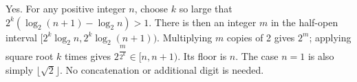 Yes. For any positive integer $n$, choose $k$ so large that $2^k(\log_2(n+1)-\log_2 n)>1$. There is then an integer $m$ in the half-open interval $[2^k\log_2 n,2^k\log_2(n+1))$. Multiplying $m$ copies of 2 gives $2^m$; applying square root $k$ times gives $2^{\dfrac{m}{2^k}}\in[n,n+1)$. Its floor is $n$. The case $n=1$ is also simply $\lfloor\sqrt2\rfloor$. No concatenation or additional digit is needed.
